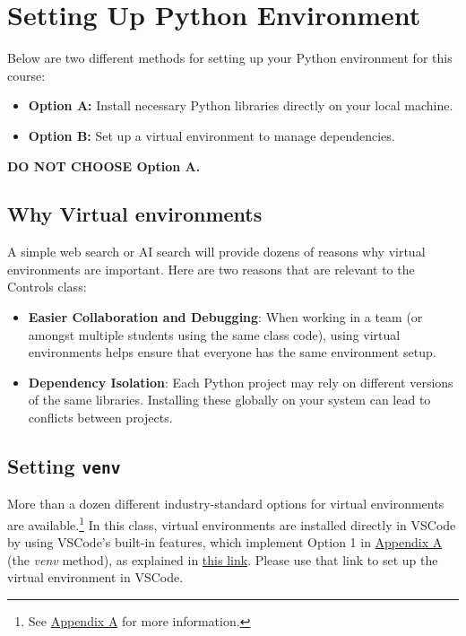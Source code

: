 \documentclass{article}
\begin{document}
\section{Setting Up Python Environment}

\noindent Below are two different methods for setting up your Python environment for this course:

\begin{itemize}
    \item \textbf{Option A:} Install necessary Python libraries directly on your local machine.
    \item \textbf{Option B:} Set up a virtual environment to manage dependencies.
\end{itemize}

\textbf{DO NOT CHOOSE Option A.}

\subsection{Why Virtual environments}
A simple web search or AI search will provide dozens of reasons why virtual environments are important. Here are two reasons that are relevant to the Controls class:
\begin{itemize}
    \item \textbf{Easier Collaboration and Debugging}: When working in a team (or amongst multiple students using the same class code), using virtual environments helps ensure that everyone has the same environment setup.
    \item \textbf{Dependency Isolation}: Each Python project may rely on different versions of the same libraries. Installing these globally on your system can lead to conflicts between projects.
\end{itemize}



\subsection{Setting \texttt{venv}}
More than a dozen different industry-standard options for virtual environments are available.\footnote{See \hyperref[appendix-a]{Appendix A} for more information.} In this class, virtual environments are installed directly in VSCode by using VSCode's built-in features, which implement Option 1 in \hyperref[appendix-a]{Appendix A} (the \textit{venv} method), as explained in  \href{https://code.visualstudio.com/docs/python/environments#_creating-environments}{this link}. Please use that link to set up the virtual environment in VSCode.
\end{document}
